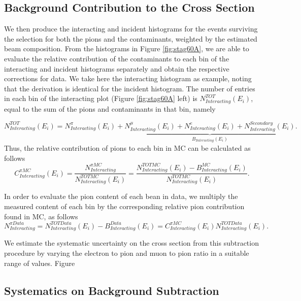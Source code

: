 \subsection{Background Contribution to the Cross Section}\label{sec:Correction}
We then produce the interacting and incident histograms for the events surviving the selection for both the pions and the contaminants, weighted by the estimated beam composition. From the histograms in Figure \ref{fig:stag60A}, we are able to evaluate the relative contribution of the contaminants to each bin of the interacting and incident histograms separately and obtain the respective corrections for data. We take here the interacting histogram as example, noting that the derivation is identical for the incident histogram. The number of entries in each bin of the interacting plot (Figure \ref{fig:stag60A} left) is  $N^{TOT}_{Interacting} (E_{i})$, equal to the sum of the pions and contaminants in that bin, namely

\begin{equation}
N^{TOT}_{Interacting} (E_{i}) =  N^\pi_{Interacting} (E_{i}) + \underbrace{ N^\mu_{Interacting} (E_{i}) + N^e_{Interacting} (E_{i}) + N^{Secondary}_{Interacting} (E_{i}) }_{B_{Interacting} (E_i)}.
\end{equation}
Thus, the relative contribution of pions to each bin in MC can be calculated as follows
\begin{equation}
C^{\pi MC}_{Interacting} (E_{i}) =  \frac{N^{\pi MC}_{Interacting}}{ N^{TOT MC}_{Interacting} (E_{i}) } =    \frac{N^{TOT MC}_{Interacting} (E_{i}) - B^ {MC}_{Interacting} (E_i)}{ N^{TOT MC}_{Interacting} (E_{i})}.
\end{equation}


In order to evaluate the pion content of each bean in data, we multiply the measured content of each bin by the corresponding relative pion contribution found in MC, as follows
\begin{equation}
N^{\pi Data}_{Interacting} = N^{TOT Data}_{Interacting} (E_{i}) - B^{Data}_{Interacting} (E_i)  =  C^{\pi MC}_{Interacting} (E_{i}) N^{TOT Data}_{Interacting} (E_{i}).
\end{equation}


We estimate the systematic uncertainty on the cross section from this subtraction procedure by varying the electron to pion and muon to pion ratio in a suitable range of values. Figure  


\subsection{Systematics on Background Subtraction}\label{sec:beamSys}



